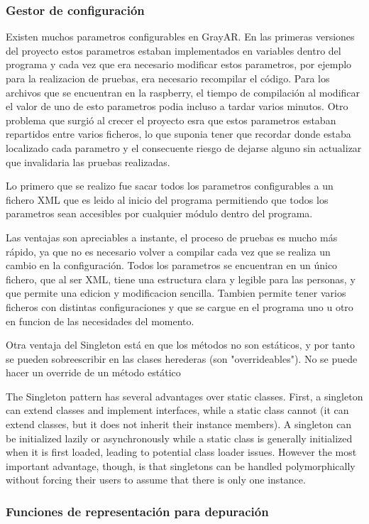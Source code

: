 \subsubsection{Gestor de configuración}
Existen muchos parametros configurables en GrayAR. En las primeras versiones del proyecto estos parametros estaban implementados en variables dentro del programa y cada vez que era necesario modificar estos parametros, por ejemplo para la realizacion de pruebas, era necesario recompilar el código. Para los archivos que se encuentran en la raspberry, el tiempo de compilación al modificar el valor de uno de esto parametros podia incluso a tardar varios minutos. Otro problema que surgió al crecer el proyecto esra que estos parametros estaban repartidos entre varios ficheros, lo que suponia tener que recordar donde estaba localizado cada parametro y el consecuente riesgo de dejarse alguno sin actualizar que invalidaria las pruebas realizadas.

Lo primero que se realizo fue sacar todos los parametros configurables a un fichero XML que es leido al inicio del programa permitiendo que todos los parametros sean accesibles por cualquier módulo dentro del programa.

Las ventajas son apreciables a instante, el proceso de pruebas es mucho más rápido, ya que no es necesario volver a compilar cada vez que se realiza un cambio en la configuración. Todos los parametros se encuentran en un único fichero, que al ser XML, tiene una estructura clara y legible para las personas, y que permite una edicion y modificacion sencilla. Tambien permite tener varios ficheros con distintas configuraciones y que se cargue en el programa uno u otro en funcion de las necesidades del momento.

  




Otra ventaja del Singleton está en que los métodos no son estáticos, y por tanto se pueden sobreescribir en las clases herederas (son "overrideables"). No se puede hacer un override de un método estático


The Singleton pattern has several advantages over static classes. First, a singleton can extend classes and implement interfaces, while a static class cannot (it can extend classes, but it does not inherit their instance members). A singleton can be initialized lazily or asynchronously while a static class is generally initialized when it is first loaded, leading to potential class loader issues. However the most important advantage, though, is that singletons can be handled polymorphically without forcing their users to assume that there is only one instance.
\subsubsection{Funciones de representación para depuración}